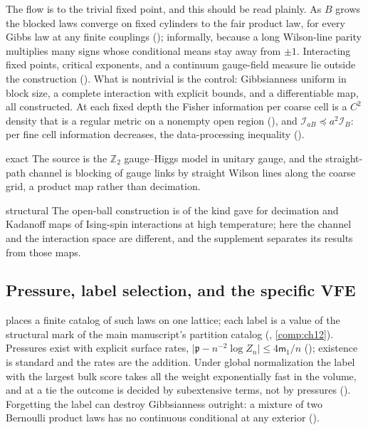The flow is to the trivial fixed point, and this should be read plainly. As \(B\) grows the blocked laws
converge on fixed cylinders to the fair product law, for every Gibbs law at any finite couplings
(); informally, because a long Wilson-line parity multiplies many
signs whose conditional means stay away from \(\pm1\). Interacting fixed points, critical exponents, and a continuum
gauge-field measure lie outside the construction (). What is nontrivial is the
control: Gibbsianness uniform in block size, a complete interaction with explicit bounds, and a
differentiable map, all constructed. At each fixed depth the Fisher information per coarse cell is a
\(C^2\) density that is a regular metric on a nonempty open region (), and
\(\mathcal I_{aB}\preceq a^2\mathcal I_B\): per fine cell information decreases, the data-processing
inequality ().

\begin{analogy}{exact}
The source is the \(\mathbb Z_2\) gauge--Higgs model in unitary gauge, and the straight-path channel is
blocking of gauge links by straight Wilson lines along the coarse grid, a product map rather than
decimation.
\end{analogy}

\begin{analogy}{structural}
The open-ball construction is of the kind \citet{Israel1981} gave for decimation and Kadanoff maps of
Ising-spin interactions at high temperature; here the channel and the interaction space are different, and
the supplement separates its results from those maps.
\end{analogy}

\subsection{Pressure, label selection, and the specific VFE}
\label{comp:sb-pressure}

 places a finite catalog of such laws on one lattice; each label is a value of the
structural mark of the main manuscript's partition catalog (,
\cref{comp:ch12}). Pressures exist with explicit surface rates, \(\lvert\mathfrak p-n^{-2}\log
Z_n\rvert\leq4\mathsf m_1/n\) (); existence is standard \citep{Georgii1988} and
the rates are the addition. Under global normalization the label with the largest bulk score takes all the
weight exponentially fast in the volume, and at a tie the outcome is decided by subextensive terms, not by
pressures (). Forgetting the label can destroy Gibbsianness outright: a mixture
of two Bernoulli product laws has no continuous conditional at any exterior ().

